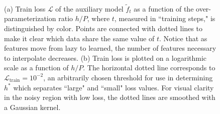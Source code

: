 \documentclass[11pt]{article}
\begin{document}
\begin{figure}[!h]
\centering

\captionsetup{width=.8\linewidth}
\\
\caption{(a) Train loss $\mathcal{L}$ of the auxiliary model $\tilde f_t$ as a function of the over-parameterization ratio $h/P$, where $t$, measured in ``training steps," is distinguished by color. Points are connected with dotted lines to make it clear which data share the same value of $t$. Notice that as features move from lazy to learned, the number of features necessary to interpolate decreases. (b) Train loss is plotted on a logarithmic scale as a function of $h/P$. The horizontal dotted line corresponds to $\mathcal L_\text{train} = 10^{-2}$, an arbitrarily chosen threshold for use in determining $h^*$ which separates ``large" and ``small" loss values. For visual clarity in the noisy region with low loss, the dotted lines are smoothed with a Gaussian kernel.}
\label{h/P_vs_train_loss}
\end{figure}
\end{document}
